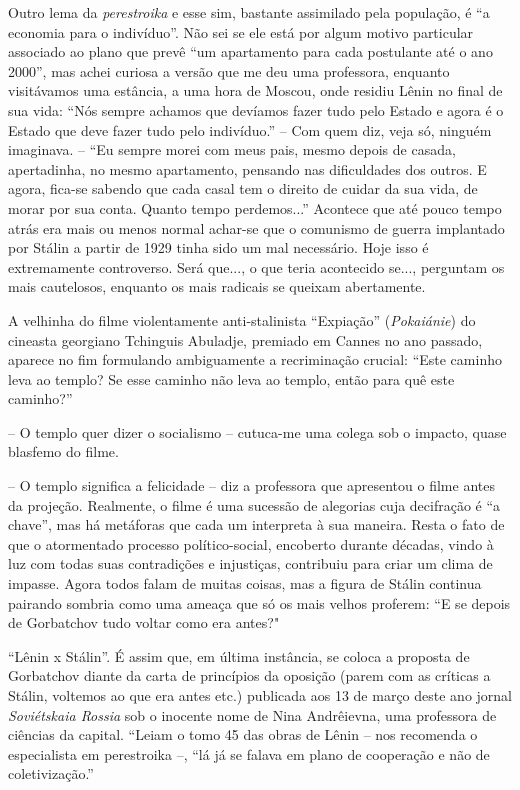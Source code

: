 Outro lema da \emph{perestroika} e esse sim, bastante assimilado pela
população, é ``a economia para o indivíduo''. Não sei se ele está por
algum motivo particular associado ao plano que prevê ``um apartamento
para cada postulante até o ano 2000'', mas achei curiosa a versão que me
deu uma professora, enquanto visitávamos uma estância, a uma hora de
Moscou, onde residiu Lênin no final de sua vida: ``Nós sempre achamos
que devíamos fazer tudo pelo Estado e agora é o Estado que deve fazer
tudo pelo indivíduo.'' -- Com quem diz, veja só, ninguém imaginava. --
``Eu sempre morei com meus pais, mesmo depois de casada, apertadinha, no
mesmo apartamento, pensando nas dificuldades dos outros. E agora,
fica-se sabendo que cada casal tem o direito de cuidar da sua vida, de
morar por sua conta. Quanto tempo perdemos...'' Acontece que até pouco
tempo atrás era mais ou menos normal achar-se que o comunismo de guerra
implantado por Stálin a partir de 1929 tinha sido um mal necessário.
Hoje isso é extremamente controverso. Será que..., o que teria
acontecido se..., perguntam os mais cautelosos, enquanto os mais
radicais se queixam abertamente.

A velhinha do filme violentamente anti-stalinista ``Expiação''
(\emph{Pokaiánie}) do cineasta georgiano Tchinguis Abuladje, premiado em
Cannes no ano passado, aparece no fim formulando ambiguamente a
recriminação crucial: ``Este caminho leva ao templo? Se esse caminho não
leva ao templo, então para quê este caminho?''

-- O templo quer dizer o socialismo -- cutuca-me uma colega sob o
impacto, quase blasfemo do filme.

-- O templo significa a felicidade -- diz a professora que apresentou o
filme antes da projeção. Realmente, o filme é uma sucessão de alegorias
cuja decifração é ``a chave'', mas há metáforas que cada um interpreta à
sua maneira. Resta o fato de que o atormentado processo político-social,
encoberto durante décadas, vindo à luz com todas suas contradições e
injustiças, contribuiu para criar um clima de impasse. Agora todos falam
de muitas coisas, mas a figura de Stálin continua pairando sombria como
uma ameaça que só os mais velhos proferem: ``E se depois de Gorbatchov
tudo voltar como era antes?"

``Lênin x Stálin''. É assim que, em última instância, se coloca a
proposta de Gorbatchov diante da carta de princípios da oposição (parem
com as críticas a Stálin, voltemos ao que era antes etc.) publicada aos
13 de março deste ano jornal \emph{Soviétskaia Rossia} sob o inocente
nome de Nina Andrêievna, uma professora de ciências da capital. ``Leiam
o tomo 45 das obras de Lênin -- nos recomenda o especialista em
perestroika --, ``lá já se falava em plano de cooperação e não de
coletivização.''

